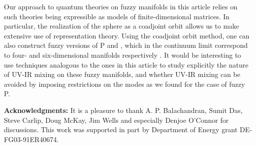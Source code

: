 \documentclass[a4paper,12pt]{article}
\numberwithin{equation}{section}
\begin{document}
Our approach to quantum theories on fuzzy manifolds in this article
relies on such theories being expressible as models of
finite-dimensional matrices. In particular, the realization of the
sphere \coordHE{} as a coadjoint orbit \coordHE{} allows us to make
extensive use of \coordHE{} representation theory. Using the coadjoint
orbit method, one can also construct fuzzy versions of \coordHE{}P\coordHE{} and \coordHE{}, which in the continuum
limit correspond to four- and six-dimensional manifolds respectively
\cite{trivai}. It would be interesting to use techniques analogous to
the ones in this article to study explicitly the nature of UV-IR
mixing on these fuzzy manifolds, and whether UV-IR mixing can be
avoided by imposing restrictions on the modes as we found for the case
of fuzzy \coordHE{}P\coordHE{}.

{\bf Acknowledgments:} It is a pleasure to thank A. P. Balachandran,
Sumit Das, Steve Carlip, Doug McKay, Jim Wells and especially Denjoe
O'Connor for discussions.  This work was supported in part by
Department of Energy grant DE-FG03-91ER40674.




\end{document}
